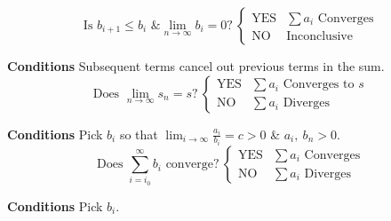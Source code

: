 \documentclass{article}
\theoremstyle{plain}
\numberwithin{theorem}{subsection}
\theoremstyle{definition}
\numberwithin{definition}{subsection}
\theoremstyle{remark}
\numberwithin{note}{subsection}
\begin{document}
\begin{multicols}{2}
\begin{mdframed}[style=exampledefaultcols,frametitle={Alternating Series}]
\begin{equation*}
			\text{Is $b_{i+1}\leqslant b_i$ \& $\lim_{n\to\infty}b_i=0$?}\:
			\begin{cases}
				\text{YES} & \text{$\sum a_i$ Converges} \\
				\text{NO} & \text{Inconclusive}
			\end{cases}
		\end{equation*}
	\end{mdframed}
	\begin{mdframed}[style=exampledefaultcols,frametitle={Telescoping Series}]
		\textbf{Conditions} Subsequent terms cancel out previous terms in the sum.
		\begin{equation*}
			\text{Does $\lim_{n\to\infty}s_n=s$?}\:
			\begin{cases}
				\text{YES} & \text{$\sum a_i$ Converges to $s$} \\
				\text{NO} & \text{$\sum a_i$ Diverges}
			\end{cases}
		\end{equation*}
	\end{mdframed}
	\begin{mdframed}[style=exampledefaultcols,frametitle={Limit Comparison Test}]
		\textbf{Conditions} Pick $b_i$ so that $\displaystyle \lim_{i\to\infty}\frac{a_i}{b_i}=c>0$ \& $a_i,\:b_n>0$.
		\begin{equation*}
			\text{Does $\sum_{i=i_0}^\infty b_i$ converge?}\:
			\begin{cases}
				\text{YES} & \text{$\sum a_i$ Converges} \\
				\text{NO} & \text{$\sum a_i$ Diverges}
			\end{cases}
		\end{equation*}
	\end{mdframed}
	\begin{mdframed}[style=exampledefaultcols,frametitle={Comparison Test}]
		\textbf{Conditions} Pick $b_i$.


\end{mdframed}
\end{multicols}
\end{document}
